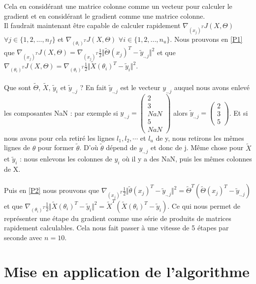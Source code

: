 \documentclass[a4paper,10pt]{article}
\begin{document}
\noindent Cela en considérant une matrice colonne comme un vecteur pour calculer le gradient et en considérant le gradient comme une matrice colonne.\\
Il faudrait maintenant être capable de calculer rapidement $\nabla_{(x_{j})^T}J(X, \Theta)$ $\forall j \in \{1, 2, ..., n_f\}$ et $\nabla_{(\theta_{i})^T} J(X, \Theta)$ $\forall i \in \{1, 2, ..., n_u\}$.
Nous prouvons en \ref{P1} que $ \nabla_{(x_{j})^T}J(X, \Theta) = \nabla_{(x_{j})^T}\frac{1}{2}\Vert\tilde{\Theta}(x_{j})^{T}-\tilde{y}_{.,j}\Vert^{2}$ et que $ \nabla_{(\theta_i)^T}J(X, \Theta) = \nabla_{(\theta_{i})^T}\frac{1}{2}\Vert\tilde{X}(\theta_{i})^{T}-\tilde{y}_{i}\Vert^{2}$.\\\\
Que sont $\tilde{\Theta}$, $\tilde{X}$, $\tilde{y}_i$ et $\tilde{y}_{., j}$ ? En fait $\tilde{y}_{.,j}$ est le vecteur $y_{.,j}$ auquel nous avons enlev\'{e} les composantes NaN : par exemple si $y_{.,j}=
\begin{pmatrix}
2\\3\\NaN\\5\\NaN
\end{pmatrix}$
alors $\tilde{y}_{.,j}=
\begin{pmatrix}
2\\3\\5
\end{pmatrix}$. Et si nous avons pour cela retir\'{e} les lignes $l_{1}, l_{2}, \cdots$ et $l_{u}$ de y, nous retirons les m\^{e}mes lignes de $\theta$ pour former $\tilde{\theta}$.  D'o\`{u} $\tilde{\theta}$ d\'{e}pend de $y_{.,j}$ et donc de j. Même chose pour $\tilde{X}$ et $\tilde{y}_i$ : nous enlevons les colonnes de $y_i$ où il y a des NaN, puis les mêmes colonnes de X.\\\\
Puis en \ref{P2} nous prouvons que $ \nabla_{(x_{j})^T}\frac{1}{2}\Vert\tilde{\theta}(x_{j})^{T}-\tilde{y}_{.,j}\Vert^{2} =  \tilde{\Theta}^{T}(\tilde{\Theta}(x_{j})^{T}-\tilde{y}_{.,j})$ et que $\nabla_{(\theta_{i})^T}\frac{1}{2}\Vert\tilde{X}(\theta_{i})^{T}-\tilde{y}_{i}\Vert^{2} =  \tilde{X}^{T}(\tilde{X}(\theta_{i})^{T}-\tilde{y}_{i})$. Ce qui nous permet de représenter une étape du gradient comme une série de produits de matrices rapidement calculables. Cela nous fait passer à une vitesse de 5 étapes par seconde avec $n = 10$.

\section{Mise en application de l'algorithme}
\end{document}
